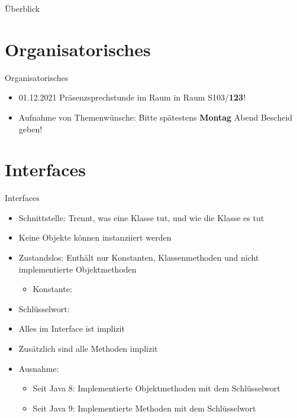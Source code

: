 \documentclass{../tuda-beamer}
\date{24. November 2021}
\begin{document}
  \maketitle

  \begin{frame}{Überblick}
    \tableofcontents
  \end{frame}


  \section{Organisatorisches}
  \begin{frame}{Organisatorisches}
    \begin{itemize}
      \item 01.12.2021 Präsenzsprechstunde im Raum in Raum S103/\textbf{123}!
      \item Aufnahme von Themenwünsche: Bitte spätestens \textbf{Montag} Abend Bescheid geben!
    \end{itemize}
  \end{frame}


  \section{Interfaces}
  \begin{frame}{Interfaces}
    \begin{itemize}
      \item Schnittstelle: Trennt, was eine Klasse tut, und wie die Klasse es tut
      \item Keine Objekte können instanziiert werden
      \item Zustandslos: Enthält nur Konstanten, Klassenmethoden und nicht implementierte
      Objektmethoden
      \begin{itemize}
        \item Konstante: 
      \end{itemize}
      \item Schlüsselwort: 
      \item Alles im Interface ist implizit 
      \item Zusätzlich sind alle Methoden implizit 
      \item Ausnahme:
      \begin{itemize}
        \item Seit Java 8: Implementierte Objektmethoden mit dem Schlüsselwort 
        \item Seit Java 9: Implementierte Methoden mit dem Schlüsselwort 
      \end{itemize}
    \end{itemize}
  \end{frame}
\end{document}

